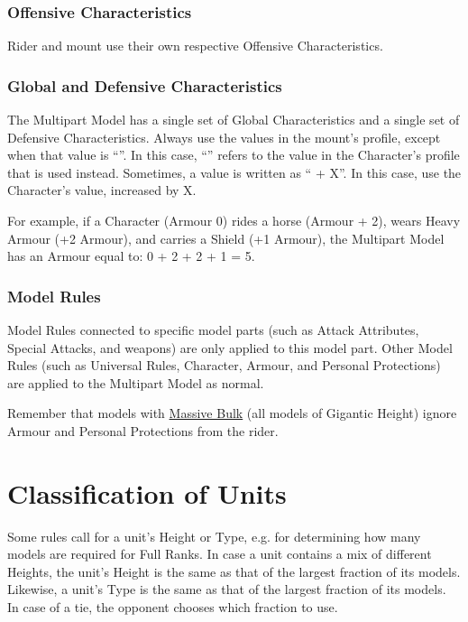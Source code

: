 \subsubsection{Offensive Characteristics}

Rider and mount use their own respective Offensive Characteristics.

\subsubsection{Global and Defensive Characteristics}
\label{defensive_and_global_characteristics}

The Multipart Model has a single set of Global Characteristics and a single set of Defensive Characteristics. Always use the values in the mount's profile, except when that value is \enquote{\ascharacter}. In this case, \enquote{\ascharacter} refers to the value in the Character's profile that is used instead. Sometimes, a value is written as \enquote{\ascharacter{} + X}. In this case, use the Character's value, increased by X.

For example, if a Character (Armour 0) rides a horse (Armour \ascharacter{} + 2), wears Heavy Armour (+2 Armour), and carries a Shield (+1 Armour), the Multipart Model has an Armour equal to: 0 + 2 + 2 + 1 = 5.

\subsubsection{Model Rules}

Model Rules connected to specific model parts (such as Attack Attributes, Special Attacks, and weapons) are only applied to this model part. Other Model Rules (such as Universal Rules, Character, Armour, and Personal Protections) are applied to the Multipart Model as normal.

Remember that models with \hyperref[massive_bulk]{Massive Bulk} (all models of Gigantic Height) ignore Armour and Personal Protections from the rider.

\columnbreak

\section{Classification of Units}
\label{classification_of_units}

Some rules call for a unit's Height or Type, e.g. for determining how many models are required for Full Ranks. In case a unit contains a mix of different Heights, the unit's Height is the same as that of the largest fraction of its models. Likewise, a unit's Type is the same as that of the largest fraction of its models. In case of a tie, the opponent chooses which fraction to use.

\RBemc
